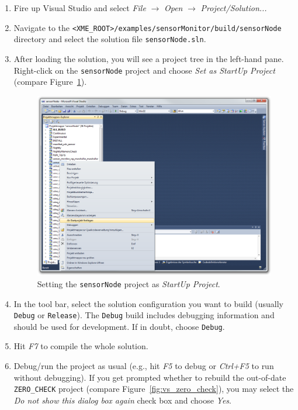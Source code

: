\begin{enumerate}
	\item Fire up Visual Studio and select \emph{File} $\rightarrow$ \emph{Open} $\rightarrow$ \emph{Project/Solution...}
	\item Navigate to the \verb|<XME_ROOT>/examples/sensorMonitor/build/sensorNode| directory and select the solution file \verb|sensorNode.sln|.
	\item After loading the solution, you will see a project tree in the left-hand pane.
		Right-click on the \verb|sensorNode| project and choose \emph{Set as StartUp Project}
		(compare Figure~\ref{fig:vs_set_as_startup_project}).

\begin{figure}[htpb]
	\centering
	\includegraphics[width=\textwidth]{figures/vs_set_as_startup_project.png}
	\caption{Setting the \texttt{sensorNode} project as \emph{StartUp Project}.}
	\label{fig:vs_set_as_startup_project}
\end{figure}

	\item In the tool bar, select the solution configuration you want to build (usually \texttt{Debug} or \texttt{Release}).
		The \texttt{Debug} build includes debugging information and should be used for development.
		If in doubt, choose \texttt{Debug}.

	\item Hit \emph{F7} to compile the whole solution.

	\item Debug/run the project as usual (e.g., hit \emph{F5} to debug or \emph{Ctrl+F5} to run without debugging).
		If you get prompted whether to rebuild the out-of-date \texttt{ZERO\_CHECK} project (compare Figure~\ref{fig:vs_zero_check}),
		you may select the \emph{Do not show this dialog box again} check box and choose \emph{Yes}.


\end{enumerate}
